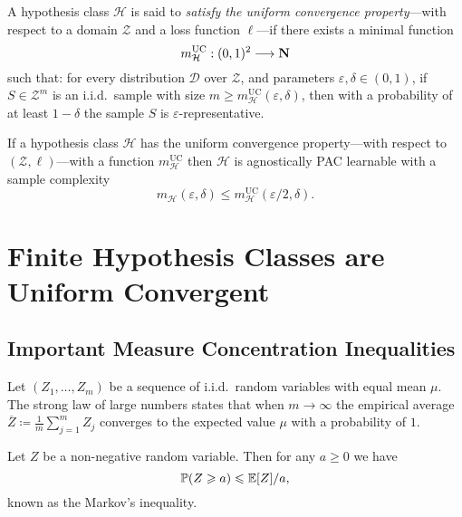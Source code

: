 \begin{definition}
    \label{def:learner-uniform-convergence-property}
    A hypothesis class \(\mathcal{H}\) is said to \emph{satisfy the uniform convergence
        property}---with respect to a domain \(\mathcal{Z}\) and a loss function
    \(\ell\)---if there exists a minimal function
    \[
        m_{\mathcal{H}}^{\text{UC}}: (0, 1)^2 \longrightarrow \mathbf{N}
    \]
    such that: for every distribution \(\mathcal{D}\) over \(\mathcal{Z}\), and
    parameters \(\varepsilon, \delta \in (0, 1)\), if \(S \in \mathcal{Z}^m\) is an
    i.i.d.~sample with size
    \(m \geq m_{\mathcal{H}}^{\text{UC}}(\varepsilon, \delta)\), then with a
    probability of at least \(1 - \delta\) the sample \(S\) is
    \(\varepsilon\)-representative.
\end{definition}

\begin{corollary}
    \label{cor:unif-conv-hypothesis-is-agnostically-pac-learnable}
    If a hypothesis class \(\mathcal{H}\) has the uniform convergence property---with
    respect to \((\mathcal{Z}, \ell)\)---with a function
    \(m_{\mathcal{H}}^{\text{UC}}\) then \(\mathcal{H}\) is agnostically PAC
    learnable with a sample complexity
    \[
        m_{\mathcal{H}}(\varepsilon, \delta) \leq
        m_{\mathcal{H}}^{\text{UC}}(\varepsilon/2, \delta).
    \]
\end{corollary}

\section{Finite Hypothesis Classes are Uniform Convergent}

\subsection{Important Measure Concentration Inequalities}

\begin{proposition}
    \label{prop:strong-law-of-large-numbers}
    Let \((Z_1, \dots, Z_m)\) be a sequence of i.i.d.~random variables with equal
    mean \(\mu\). The strong law of large numbers states that when \(m \to \infty\)
    the empirical average \(\overline Z \coloneq \frac{1}{m} \sum_{j=1}^m Z_j\)
    converges to the expected value \(\mu\) with a probability of \(1\).
\end{proposition}

\begin{lemma}
    \label{lem:markov-inequality}
    Let \(Z\) be a non-negative random variable. Then for any \(a \geq 0\) we have
    \[
        \operatorname{\mathbb{P}}(Z \geqslant a) \leqslant \operatorname{\mathbb{E}}[Z] / a,
    \]
    known as the Markov's inequality.
\end{lemma}

